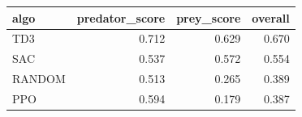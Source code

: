 \begin{tabular}{lrrr}
\toprule
algo & predator\_score & prey\_score & overall \\
\midrule
TD3 & 0.712 & 0.629 & 0.670 \\
SAC & 0.537 & 0.572 & 0.554 \\
RANDOM & 0.513 & 0.265 & 0.389 \\
PPO & 0.594 & 0.179 & 0.387 \\
\bottomrule
\end{tabular}
